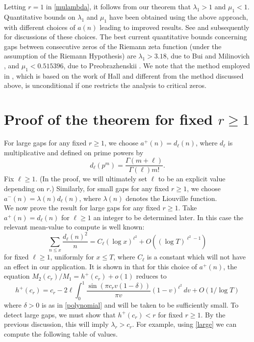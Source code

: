 \documentclass[oneside]{amsart}
\begin{document}
Letting $r=1$ in \eqref{mulambda}, it follows from our theorem that $\lambda_1 >1$ and $\mu_1 <1$. Quantitative bounds on $\lambda_1$ and $\mu_1$ have been obtained using the above approach, with different choices of $a(n)$ leading to improved results. See \cite{BMN10} and subsequently \cite{FengWu} for discussions of these choices. The best current quantitative bounds concerning gaps between consecutive zeros of the Riemann zeta function (under the assumption of the Riemann Hypothesis) are $\lambda_1 > 3.18$, due to Bui and Milinovich \cite{BM17} , and $\mu_1 <0.515396$, due to Preobrazhenskii \cite{Preo}. We note that the method employed in \cite{BM17}, which is based on the work of Hall \cite{Hall} and different from the method discussed above, is unconditional if one restricts the analysis to critical zeros. 



\section{Proof of the theorem for fixed $r\ge 1$}\label{proof}
For large gaps for any fixed $r\ge 1$, we choose $a^+(n) = d_{\ell}(n)$, where $d_\ell$ is multiplicative and defined on prime powers by 
\[
d_\ell(p^m)= \frac{\Gamma(m+\ell)}{\Gamma(\ell)m!}.
\]
Fix $\ell\ge 1$. (In the proof, we will ultimately set $\ell$ to be an explicit value depending on $r$.) Similarly, for small gaps for any fixed $r\ge 1$, we choose $a^-(n) = \lambda(n)d_{\ell}(n)$, where $\lambda(n)$ denotes the Liouville function.\\


We now prove the result for large gaps for any fixed $r \ge 1$. Take $a^+(n) = d_\ell(n)$ for $\ell \ge 1$ an integer to be determined later. In this case the relevant mean-value to compute is well known:
\begin{equation*}
\sum_{n \le x} \frac{d_\ell(n)^2}{n} = C_\ell(\log x)^{\ell^2}+O((\log T)^{\ell^2-1})
\end{equation*}
for fixed $\ell \ge 1$, uniformly for $x \le T$, where $C_\ell$ is a constant which will not have an effect in our application. It is shown in \cite[p.422]{CGG84} that for this choice of $a^+(n)$, the equation  $M_2(c_r) / M_1 = h^+(c_r)+o(1)$ reduces to 
\begin{equation}\label{large}
h^+(c_r) = c_r -2\ell \int_{0}^{1}\frac{\sin(\pi c_r v(1-\delta))}{\pi v}(1-v)^{\ell^2}\,dv + O(1/\log T)
\end{equation}
where $\delta>0$ is as in \eqref{polynomial} and will be taken to be sufficiently small. To detect large gaps, we must show that $h^+(c_r) < r$ for fixed $r\ge 1$. By the previous discussion, this will imply $\lambda_r > c_r$. For example, using \eqref{large} we can compute the following table of values.
\end{document}
